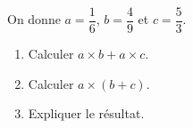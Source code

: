 
\begin{exercice}\label{exosmath-0878}

    On donne \( a=\dfrac{ 1 }{ 6 }\), \( b=\dfrac{ 4 }{ 9 }\) et \( c=\dfrac{ 5 }{ 3 }\).
    \begin{enumerate}
        \item
            Calculer \( a\times b+a\times c\).
        \item
            Calculer \( a\times (b+c)\).
        \item
            Expliquer le résultat.
    \end{enumerate}

\end{exercice}
